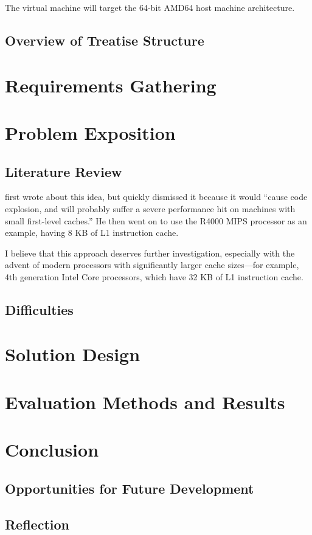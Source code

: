 	The virtual machine will target the 64-bit AMD64 host machine architecture.  
	
	\section{Overview of Treatise Structure}
	
\chapter{Requirements Gathering}

\chapter{Problem Exposition}
	\section{Literature Review}
	\cite{stackcaching} first wrote about this idea, but quickly dismissed it because it would ``cause code explosion, and will probably suffer a severe performance hit on machines with small first-level caches.'' He then went on to use the R4000 MIPS processor as an example, having 8 KB of L1 instruction cache.
	
	I believe that this approach deserves further investigation, especially with the advent of modern processors with significantly larger cache sizes---for example, 4th generation Intel Core processors, which have 32 KB of L1 instruction cache.\citep{haswellarch}
	
	\section{Difficulties}

\chapter{Solution Design}

\chapter{Evaluation Methods and Results}

\chapter{Conclusion}
	
	\section{Opportunities for Future Development}
	
	\section{Reflection}

\bibliographysection

